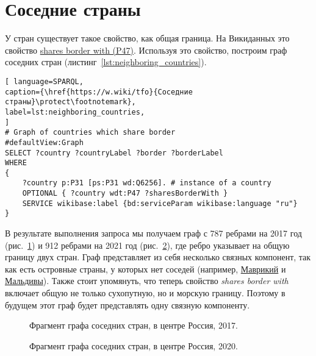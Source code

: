 \section{Соседние страны}

У стран существует такое свойство, как общая граница. На Викиданных это свойство  \href{https://www.wikidata.org/wiki/Property:P47}{shares border with (P47)}. Используя это свойство, построим граф соседних стран (листинг~\ref{lst:neighboring_countries}).
\begin{lstlisting}[ language=SPARQL, 
caption={\href{https://w.wiki/tfo}{Соседние страны}\protect\footnotemark},
label=lst:neighboring_countries, 
]
# Graph of countries which share border
#defaultView:Graph
SELECT ?country ?countryLabel ?border ?borderLabel
WHERE
{
	?country p:P31 [ps:P31 wd:Q6256]. # instance of a country
	OPTIONAL { ?country wdt:P47 ?sharesBorderWith }
	SERVICE wikibase:label {bd:serviceParam wikibase:language "ru"}
}
\end{lstlisting}


В результате выполнения запроса мы получаем граф с 787 ребрами на 2017 год (рис.~\ref{fig:neighboring_countries_2017}) и 912 ребрами на 2021 год (рис.~\ref{fig:neighboring_countries_2020}), где ребро указывает на общую границу двух стран. Граф представляет из себя несколько связных компонент, так как есть островные страны, у которых нет соседей (например, \href{https://w.wiki/vC7}{Маврикий} и \href{https://w.wiki/vC8}{Мальдивы}). Также стоит упомянуть, что теперь свойство {\textit{shares border with}} включает общую не только сухопутную, но и морскую границу. Поэтому в будущем этот граф будет представлять одну связную компоненту. 

\begin{figure}
	{
		\setlength{\fboxsep}{0pt}%
		\setlength{\fboxrule}{1pt}%
	}
	\caption{Фрагмент графа соседних стран, в центре Россия, 2017.
	}%
	\label{fig:neighboring_countries_2017}%
\end{figure}

\begin{figure}
	{
		\setlength{\fboxsep}{0pt}%
		\setlength{\fboxrule}{1pt}%
	}
	\caption{Фрагмент графа соседних стран, в центре Россия, 2020.
	}%
	\label{fig:neighboring_countries_2020}%
\end{figure}

